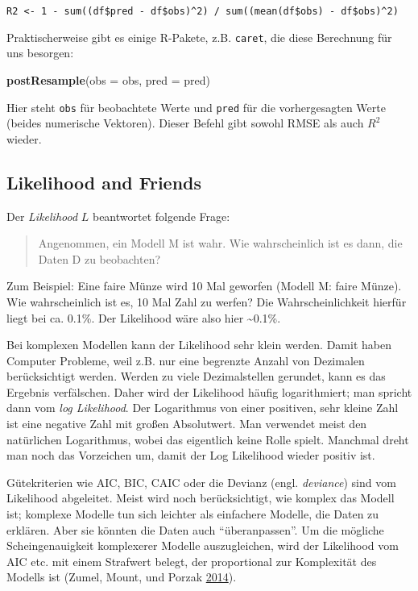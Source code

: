 \documentclass[12pt,ngerman,]{book}
\makeatletter
\newenvironment{Shaded}{\begin{snugshade}}{\end{snugshade}}
\newcommand{\KeywordTok}[1]{\textcolor[rgb]{0.13,0.29,0.53}{\textbf{{#1}}}}
\newcommand{\DataTypeTok}[1]{\textcolor[rgb]{0.13,0.29,0.53}{{#1}}}
\newcommand{\NormalTok}[1]{{#1}}
\newenvironment{kframe}{%
\medskip{}
\setlength{\fboxsep}{.8em}
 \def\at@end@of@kframe{}%
 \ifinner\ifhmode%
  \def\at@end@of@kframe{\end{minipage}}%
  \begin{minipage}{\columnwidth}%
 \fi\fi%
 \def\FrameCommand##1{\hskip\@totalleftmargin \hskip-\fboxsep
 \colorbox{shadecolor}{##1}\hskip-\fboxsep
     \hskip-\linewidth \hskip-\@totalleftmargin \hskip\columnwidth}%
 \MakeFramed {\advance\hsize-\width
   \@totalleftmargin\z@ \linewidth\hsize
   \@setminipage}}%
 {\par\unskip\endMakeFramed%
 \at@end@of@kframe}
\renewenvironment{Shaded}{\begin{kframe}}{\end{kframe}}
\makeatother
\begin{document}
\texttt{R2\ \textless{}-\ 1\ -\ sum((df\$pred\ -\ df\$obs)\^{}2)\ /\ sum((mean(df\$obs)\ -\ df\$obs)\^{}2)}

Praktischerweise gibt es einige R-Pakete, z.B. \texttt{caret}, die diese
Berechnung für uns besorgen:

\begin{Shaded}
\begin{Highlighting}[]

\KeywordTok{postResample}\NormalTok{(}\DataTypeTok{obs =} \NormalTok{obs, }\DataTypeTok{pred =} \NormalTok{pred)}
\end{Highlighting}
\end{Shaded}

Hier steht \texttt{obs} für beobachtete Werte und \texttt{pred} für die
vorhergesagten Werte (beides numerische Vektoren). Dieser Befehl gibt
sowohl RMSE als auch \(R^2\) wieder.

\subsection{Likelihood and Friends}\label{likelihood-and-friends}

Der \emph{Likelihood} \(L\) beantwortet folgende Frage:

\begin{quote}
Angenommen, ein Modell M ist wahr. Wie wahrscheinlich ist es dann, die
Daten D zu beobachten?
\end{quote}

Zum Beispiel: Eine faire Münze wird 10 Mal geworfen (Modell M: faire
Münze). Wie wahrscheinlich ist es, 10 Mal Zahl zu werfen? Die
Wahrscheinlichkeit hierfür liegt bei ca. 0.1\%. Der Likelihood wäre also
hier \textasciitilde{}0.1\%.

Bei komplexen Modellen kann der Likelihood sehr klein werden. Damit
haben Computer Probleme, weil z.B. nur eine begrenzte Anzahl von
Dezimalen berücksichtigt werden. Werden zu viele Dezimalstellen
gerundet, kann es das Ergebnis verfälschen. Daher wird der Likelihood
häufig logarithmiert; man spricht dann vom \emph{log Likelihood}. Der
Logarithmus von einer positiven, sehr kleine Zahl ist eine negative Zahl
mit großen Absolutwert. Man verwendet meist den natürlichen Logarithmus,
wobei das eigentlich keine Rolle spielt. Manchmal dreht man noch das
Vorzeichen um, damit der Log Likelihood wieder positiv ist.

Gütekriterien wie AIC, BIC, CAIC oder die Devianz (engl.
\emph{deviance}) sind vom Likelihood abgeleitet. Meist wird noch
berücksichtigt, wie komplex das Modell ist; komplexe Modelle tun sich
leichter als einfachere Modelle, die Daten zu erklären. Aber sie könnten
die Daten auch ``überanpassen''. Um die mögliche Scheingenauigkeit
komplexerer Modelle auszugleichen, wird der Likelihood vom AIC etc. mit
einem Strafwert belegt, der proportional zur Komplexität des Modells ist
(Zumel, Mount, und Porzak
\protect\hyperlink{ref-zumel2014practical}{2014}).
\end{document}
